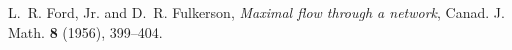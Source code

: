 L.~R. Ford, Jr. and D.~R. Fulkerson,
\emph{Maximal flow through a network},
Canad. J. Math. \textbf{8} (1956), 399--404.

